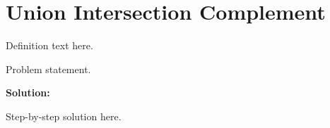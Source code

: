 \section{Union Intersection Complement}


\begin{definition}[Term]
Definition text here.
\end{definition}

\begin{example}
Problem statement.

\textbf{Solution:}

Step-by-step solution here.
\end{example}
